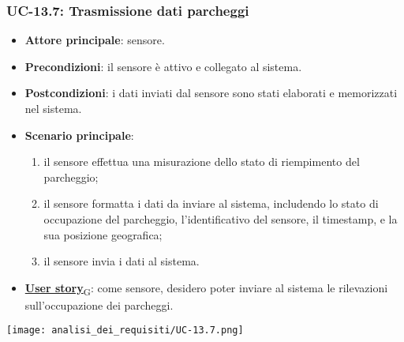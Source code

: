 \subsubsection{UC-13.7: Trasmissione dati parcheggi}
\begin{itemize}
	\item \textbf{Attore principale}: sensore.
	\item \textbf{Precondizioni}: il sensore è attivo e collegato al sistema.
	\item \textbf{Postcondizioni}: i dati inviati dal sensore sono stati elaborati e memorizzati nel sistema.
	\item \textbf{Scenario principale}:
	      \begin{enumerate}
		      \item il sensore effettua una misurazione dello stato di riempimento del parcheggio;
		      \item il sensore formatta i dati da inviare al sistema, includendo lo stato di occupazione del parcheggio, l'identificativo del sensore,
		            il timestamp, e la sua posizione geografica;
		      \item il sensore invia i dati al sistema.
	      \end{enumerate}
	\item \href{https://7last.github.io/docs/rtb/documentazione-interna/glossario\#user-story}{\textbf{User story}\textsubscript{G}}:
	      come sensore, desidero poter inviare al sistema le rilevazioni sull'occupazione dei parcheggi.
\end{itemize}

\begin{center}
	\texttt{[image: analisi\_dei\_requisiti/UC-13.7.png]}
\end{center}

